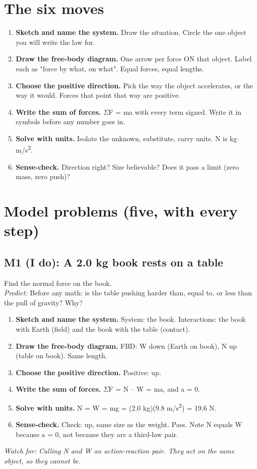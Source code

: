 \documentclass[11pt]{article}
\begin{document}
\section*{The six moves}\begin{enumerate}\item \textbf{Sketch and name the system.} Draw the situation. Circle the one object you will write the law for.
\item \textbf{Draw the free-body diagram.} One arrow per force ON that object. Label each as "force by what, on what". Equal forces, equal lengths.
\item \textbf{Choose the positive direction.} Pick the way the object accelerates, or the way it would. Forces that point that way are positive.
\item \textbf{Write the sum of forces.} $\Sigma$F = ma with every term signed. Write it in symbols before any number goes in.
\item \textbf{Solve with units.} Isolate the unknown, substitute, carry units. N is kg$\cdot$m/s\textsuperscript{2}.
\item \textbf{Sense-check.} Direction right? Size believable? Does it pass a limit (zero mass, zero push)?\end{enumerate}
\section*{Model problems (five, with every step)}
\subsection*{M1 (I do): A 2.0 kg book rests on a table}
Find the normal force on the book.\\ \textit{Predict:} Before any math: is the table pushing harder than, equal to, or less than the pull of gravity? Why? 
\begin{enumerate}
\item \textbf{Sketch and name the system.} System: the book. Interactions: the book with Earth (field) and the book with the table (contact).
\item \textbf{Draw the free-body diagram.} FBD: W down (Earth on book), N up (table on book). Same length.
\item \textbf{Choose the positive direction.} Positive: up.
\item \textbf{Write the sum of forces.} $\Sigma$F = N -- W = ma, and a = 0.
\item \textbf{Solve with units.} N = W = mg = (2.0 kg)(9.8 m/s\textsuperscript{2}) = 19.6 N.
\item \textbf{Sense-check.} Check: up, same size as the weight. Pass. Note N equals W because a = 0, not because they are a third-law pair.
\end{enumerate}
 \quad \textit{Watch for: Calling N and W an action-reaction pair. They act on the same object, so they cannot be.}\par
\end{document}
